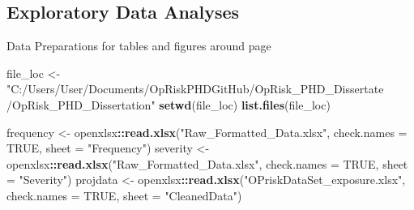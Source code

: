 \documentclass[]{DissertateUSU}
\newenvironment{Shaded}{\begin{snugshade}}{\end{snugshade}}
\newcommand{\KeywordTok}[1]{\textcolor[rgb]{0.13,0.29,0.53}{\textbf{#1}}}
\newcommand{\DataTypeTok}[1]{\textcolor[rgb]{0.13,0.29,0.53}{#1}}
\newcommand{\StringTok}[1]{\textcolor[rgb]{0.31,0.60,0.02}{#1}}
\newcommand{\OtherTok}[1]{\textcolor[rgb]{0.56,0.35,0.01}{#1}}
\newcommand{\OperatorTok}[1]{\textcolor[rgb]{0.81,0.36,0.00}{\textbf{#1}}}
\newcommand{\NormalTok}[1]{#1}
\begin{document}
\normalsize

\clearpage

\subsection*{Exploratory Data Analyses}\label{exploratory-data-analyses}

Data Preparations for tables and figures around page

\small

\begin{Shaded}
\begin{Highlighting}[]
\NormalTok{file_loc <-}\StringTok{ "C:/Users/User/Documents/OpRiskPHDGitHub/OpRisk_PHD_Dissertate}
\StringTok{/OpRisk_PHD_Dissertation"}
\KeywordTok{setwd}\NormalTok{(file_loc)}
\KeywordTok{list.files}\NormalTok{(file_loc)}

\NormalTok{frequency <-}\StringTok{ }\NormalTok{openxlsx}\OperatorTok{::}\KeywordTok{read.xlsx}\NormalTok{(}\StringTok{"Raw_Formatted_Data.xlsx"}\NormalTok{, }
                                 \DataTypeTok{check.names =} \OtherTok{TRUE}\NormalTok{, }\DataTypeTok{sheet =} \StringTok{"Frequency"}\NormalTok{)}
\NormalTok{severity <-}\StringTok{ }\NormalTok{openxlsx}\OperatorTok{::}\KeywordTok{read.xlsx}\NormalTok{(}\StringTok{"Raw_Formatted_Data.xlsx"}\NormalTok{, }
                                \DataTypeTok{check.names =} \OtherTok{TRUE}\NormalTok{, }\DataTypeTok{sheet =} \StringTok{"Severity"}\NormalTok{)}
\NormalTok{projdata <-}\StringTok{ }\NormalTok{openxlsx}\OperatorTok{::}\KeywordTok{read.xlsx}\NormalTok{(}\StringTok{"OPriskDataSet_exposure.xlsx"}\NormalTok{, }
                                \DataTypeTok{check.names =} \OtherTok{TRUE}\NormalTok{, }\DataTypeTok{sheet =} \StringTok{"CleanedData"}\NormalTok{)}
\end{Highlighting}
\end{Shaded}

\normalsize

\small
\end{document}
